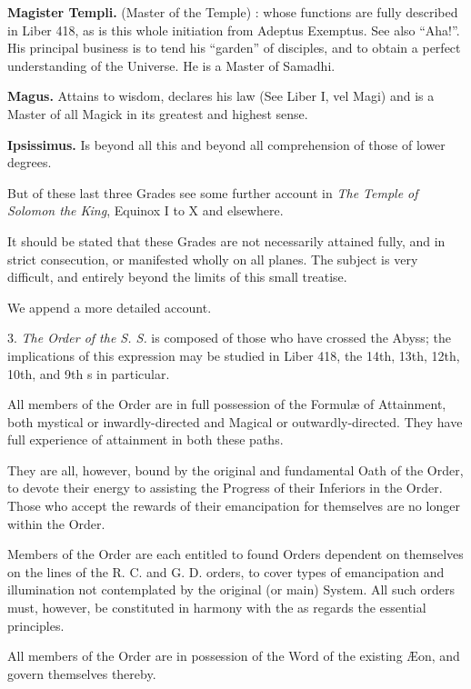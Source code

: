 \textbf{Magister Templi.} \textemdash{} (Master of the Temple) : whose functions are fully described in Liber 418, as is this whole initiation from Adeptus Exemptus. See also \enquote{Aha!}. His principal business is to tend his \enquote{garden} of disciples, and to obtain a perfect understanding of the Universe. He is a Master of Samadhi.

\textbf{Magus.} \textemdash{} Attains to wisdom, declares his law (See Liber I, vel Magi) and is a Master of all Magick in its greatest and
highest sense.

\textbf{Ipsissimus.} \textemdash{} Is beyond all this and beyond all comprehension of those of lower degrees.

But of these last three Grades see some further account in \textit{The Temple of Solomon the King}, Equinox I to X and elsewhere.

It should be stated that these Grades are not necessarily attained fully, and in strict consecution, or manifested wholly on all planes. The subject is very difficult, and entirely beyond the limits of this small treatise.

We append a more detailed account.

\vspace{\baselineskip}

3. \textit{The Order of the S. S.} is composed of those who have crossed the Abyss; the implications of this expression may be studied in Liber 418, the 14th, 13th, 12th, 10th, and 9th \AEthyr{}s\index{\AEthyr{}|(} in particular.

All members of the Order are in full possession of the Formul\ae{} of Attainment, both mystical or inwardly-directed and Magical or outwardly-directed. They have full experience of attainment in both these paths.

They are all, however, bound by the original and fundamental Oath of the Order, to devote their energy to assisting the Progress of their Inferiors in the Order. Those who accept the rewards of their emancipation for themselves are no longer within the Order.

Members of the Order are each entitled to found Orders dependent on themselves on the lines of the R. C. and G. D. orders, to cover types of emancipation and illumination not contemplated by the original (or main) System. All such orders must, however, be constituted in harmony with the \Argentium{} as regards the essential principles.

All members of the Order are in possession of the Word of the existing \AE{}on, and govern themselves thereby.

